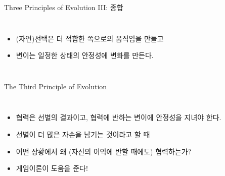 \documentclass[final]{beamer}
\begin{document}
\begin{frame}[t]{Three Principles of Evolution III: 종합}
	\begin{columns}[c]
		\column{18em}
		\begin{itemize}
			\item (자연)선택은 더 적합한 쪽으로의 움직임을 만들고  
			\item 변이는 일정한 상태의 안정성에 변화를 만든다. 
		\end{itemize}
		\column{13em}
		\hspace{-1em}
	\end{columns}
\end{frame}

\begin{frame}[t]{The Third Principle of Evolution}
	\begin{columns}[c]
		\column{18em}
		\begin{itemize}
			\item 협력은 선별의 결과이고, 협력에 반하는 변이에 안정성을 지녀야 한다. 
			\item 선별이 더 많은 자손을 남기는 것이라고 할 때
			\item 어떤 상황에서 왜 (자신의 이익에 반할 때에도) 협력하는가? 
			\item 게임이론이 도움을 준다! 
		\end{itemize}
		\column{13em}
	\end{columns}
\end{frame}
\end{document}
